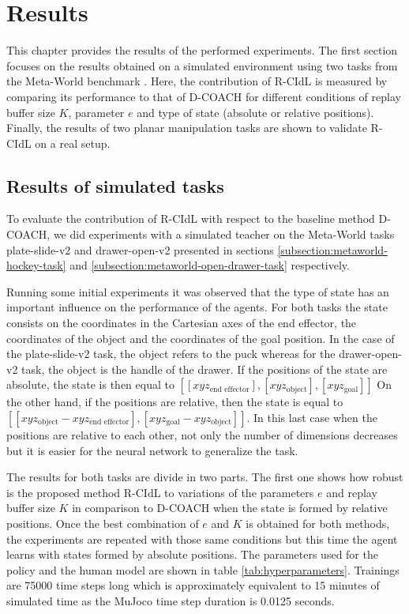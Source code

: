 \chapter{Results}
\label{chapter:Results}

This chapter provides the results of the performed experiments. The first section focuses on the results obtained on a simulated environment using two tasks from the Meta-World benchmark \cite{metaworld}. Here, the contribution of R-CIdL is measured by comparing its performance to that of D-COACH for different conditions of replay buffer size $K$, parameter $e$ and type of state (absolute or relative positions).
Finally, the results of two planar manipulation tasks are shown to validate R-CIdL on a real setup.



\section{Results of simulated tasks}
\label{section:results_metaworld}

To evaluate the contribution of R-CIdL with respect to the baseline method D-COACH, we did experiments with a simulated teacher on the Meta-World tasks plate-slide-v2 and drawer-open-v2  presented in sections \ref{subsection:metaworld-hockey-task} and
\ref{subsection:metaworld-open-drawer-task} respectively. 

Running some initial experiments it was observed that the type of state has an important influence on the performance of the agents. For both tasks the state consists on the coordinates in the Cartesian axes of the end effector, the coordinates of the object and the coordinates of the goal position. In the case of the plate-slide-v2 task, the object refers to the puck whereas for the drawer-open-v2 task, the object is the handle of the drawer.
If the positions of the state are absolute, the state is then equal to $[[xyz_\text{end effector}], [xyz_\text{object}], [xyz_\text{goal}]]$ 
On the other hand, if the positions are relative, then the state is equal to $[[xyz_\text{object} - xyz_\text{end effector}], [xyz_\text{goal} - xyz_\text{object}]]$. In this last case when the positions are relative to each other, not only the number of dimensions decreases but it is easier for the neural network to generalize the task.

The results for both tasks are divide in two parts. The first one shows how robust is the proposed method R-CIdL to variations of the parameters $e$ and replay buffer size $K$ in comparison to D-COACH when the state is formed by relative positions. Once the best combination of $e$ and $K$ is obtained for both methods, the experiments are repeated with those same conditions but this time the agent learns with states formed by absolute positions. The parameters used for the policy and the human model are shown in table \ref{tab:hyperparameters}. Trainings are 75000 time steps long which is approximately equivalent to 15 minutes of simulated time as the MuJoco time step duration is 0.0125 seconds.

